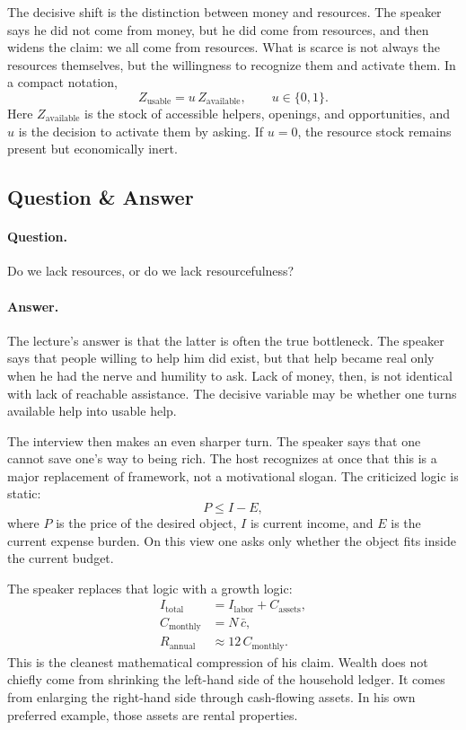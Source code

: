 The decisive shift is the distinction between money and resources. The speaker says he did not come from money, but he did come from resources, and then widens the claim: we all come from resources. What is scarce is not always the resources themselves, but the willingness to recognize them and activate them. In a compact notation,
\begin{equation}
Z_{\mathrm{usable}} = u\,Z_{\mathrm{available}},
\qquad
u\in\{0,1\}.
\end{equation}
Here \(Z_{\mathrm{available}}\) is the stock of accessible helpers, openings, and opportunities, and \(u\) is the decision to activate them by asking. If \(u=0\), the resource stock remains present but economically inert.

\subsection{Question \& Answer}

\paragraph{Question.} Do we lack resources, or do we lack resourcefulness?

\paragraph{Answer.} The lecture's answer is that the latter is often the true bottleneck. The speaker says that people willing to help him did exist, but that help became real only when he had the nerve and humility to ask. Lack of money, then, is not identical with lack of reachable assistance. The decisive variable may be whether one turns available help into usable help.

The interview then makes an even sharper turn. The speaker says that one cannot save one's way to being rich. The host recognizes at once that this is a major replacement of framework, not a motivational slogan. The criticized logic is static:
\begin{equation}
P \le I-E,
\end{equation}
where \(P\) is the price of the desired object, \(I\) is current income, and \(E\) is the current expense burden. On this view one asks only whether the object fits inside the current budget.

The speaker replaces that logic with a growth logic:
\begin{align}
I_{\mathrm{total}} &= I_{\mathrm{labor}} + C_{\mathrm{assets}},\\
C_{\mathrm{monthly}} &= N\,\bar c,\\
R_{\mathrm{annual}} &\approx 12\,C_{\mathrm{monthly}}.
\end{align}
This is the cleanest mathematical compression of his claim. Wealth does not chiefly come from shrinking the left-hand side of the household ledger. It comes from enlarging the right-hand side through cash-flowing assets. In his own preferred example, those assets are rental properties.

